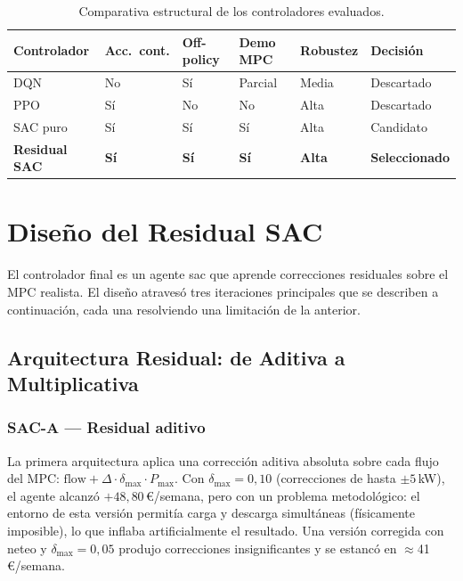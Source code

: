 \documentclass[12pt, a4paper, twoside]{report}
\begin{document}
\begin{table}[H]
\centering
\caption{Comparativa estructural de los controladores evaluados.}
\label{tab:candidatos}
\begin{tabularx}{\textwidth}{L{2.5cm}C{1.6cm}C{1.7cm}C{1.8cm}C{1.7cm}L{2cm}}
\toprule
\textbf{Controlador} & \textbf{Acc.\ cont.} & \textbf{Off-policy} &
\textbf{Demo MPC} & \textbf{Robustez} & \textbf{Decisión} \\
\midrule
DQN & No & Sí & Parcial & Media & Descartado \\
PPO & Sí & No & No & Alta & Descartado \\
SAC puro & Sí & Sí & Sí & Alta & Candidato \\
\textbf{Residual SAC} & \textbf{Sí} & \textbf{Sí} & \textbf{Sí} &
\textbf{Alta} & \textbf{Seleccionado} \\
\bottomrule
\end{tabularx}
\end{table}

\section{Diseño del Residual SAC}
\label{sec:residual_sac}

El controlador final es un agente \acrfull{sac} que aprende correcciones
residuales sobre el MPC realista. El diseño atravesó tres iteraciones
principales que se describen a continuación, cada una resolviendo una
limitación de la anterior.

\subsection{Arquitectura Residual: de Aditiva a Multiplicativa}

\subsubsection{SAC-A — Residual aditivo}

La primera arquitectura aplica una corrección aditiva absoluta sobre cada flujo
del MPC: $\text{flow} + \Delta \cdot \delta_{\max} \cdot P_{\max}$. Con
$\delta_{\max} = 0{,}10$ (correcciones de hasta $\pm5$\,kW), el agente alcanzó
$+48{,}80$\,€/semana, pero con un problema metodológico: el entorno de esta
versión permitía carga y descarga simultáneas (físicamente imposible), lo que
inflaba artificialmente el resultado. Una versión corregida con neteo y
$\delta_{\max} = 0{,}05$ produjo correcciones insignificantes y se estancó en
$\approx$41\,€/semana.
\end{document}
